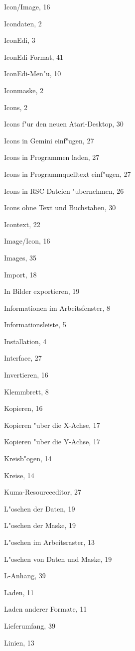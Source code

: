 \begin{theindex}
  \item Icon/Image, 16
  \item Icondaten, 2
  \item IconEdi, 3
  \item IconEdi-Format, 41
  \item IconEdi-Men"u, 10
  \item Iconmaske, 2
  \item Icons, 2
  \item Icons f"ur den neuen Atari-Desktop, 30
  \item Icons in Gemini einf"ugen, 27
  \item Icons in Programmen laden, 27
  \item Icons in Programmquelltext einf"ugen, 27
  \item Icons in RSC-Dateien "ubernehmen, 26
  \item Icons ohne Text und Buchstaben, 30
  \item Icontext, 22
  \item Image/Icon, 16
  \item Images, 35
  \item Import, 18
  \item In Bilder exportieren, 19
  \item Informationen im Arbeitsfenster, 8
  \item Informationsleiste, 5
  \item Installation, 4
  \item Interface, 27
  \item Invertieren, 16

  \indexspace

  \item Klemmbrett, 8
  \item Kopieren, 16
  \item Kopieren "uber die X-Achse, 17
  \item Kopieren "uber die Y-Achse, 17
  \item Kreisb"ogen, 14
  \item Kreise, 14
  \item Kuma-Resourceeditor, 27

  \indexspace

  \item L"oschen der Daten, 19
  \item L"oschen der Maske, 19
  \item L"oschen im Arbeitsraster, 13
  \item L"oschen von Daten und Maske, 19
  \item L-Anhang, 39
  \item Laden, 11
  \item Laden anderer Formate, 11
  \item Lieferumfang, 39
  \item Linien, 13


\end{theindex}
